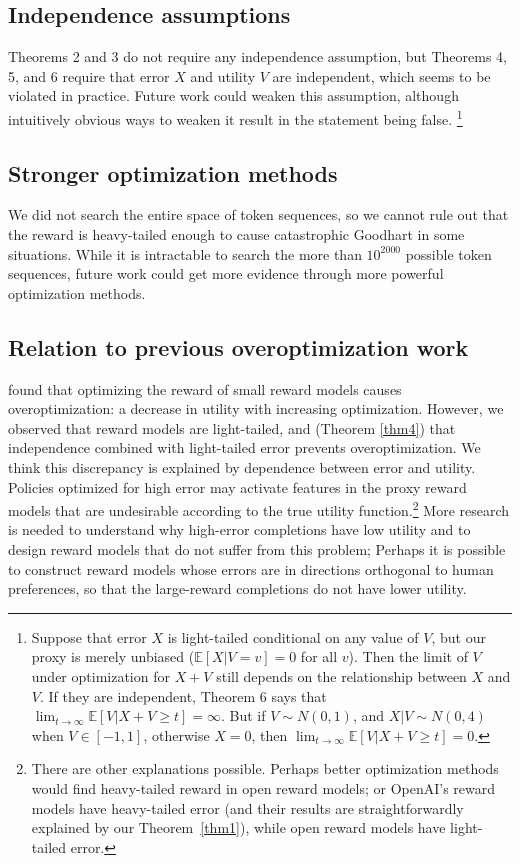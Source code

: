 \documentclass{article}
\theoremstyle{plain}
\theoremstyle{definition}
\theoremstyle{remark}
\begin{document}
\subsection{Independence assumptions}

Theorems 2 and 3 do not require any independence assumption, but Theorems 4, 5, and 6 require that error $X$ and utility $V$ are independent, which seems to be violated in practice. Future work could weaken this assumption, although intuitively obvious ways to weaken it result in the statement being false. \footnote{Suppose that error $X$ is light-tailed conditional on any value of $V$, but our proxy is merely unbiased ($\mathbb E[X|V=v]=0$ for all $v$). Then the limit of $V$ under optimization for $X+V$ still depends on the relationship between $X$ and $V$. If they are independent, Theorem 6 says that \(\lim_{t \to\infty} \mathbb E[V | X + V \ge t] = \infty\). But if \(V \sim N(0, 1)\), and \(X | V \sim N(0, 4)\) when \(V \in [-1, 1]\), otherwise \(X=0\), then \(\lim_{t \to\infty} \mathbb E[V | X + V \ge t] = 0\).} 

\subsection{Stronger optimization methods}

We did not search the entire space of token sequences, so we cannot rule out that the reward is heavy-tailed enough to cause catastrophic Goodhart in some situations. While it is intractable to search the more than $10^{2000}$ possible token sequences, future work could get more evidence through more powerful optimization methods.

\subsection{Relation to previous overoptimization work}

\citet{gao2023scaling} found that optimizing the reward of small reward models causes overoptimization: a decrease in utility with increasing optimization. However, we observed that reward models are light-tailed, and (Theorem \ref{thm4}) that independence combined with light-tailed error prevents overoptimization. We think this discrepancy is explained by dependence between error and utility. Policies optimized for high error may activate features in the proxy reward models that are undesirable according to the true utility function.\footnote{There are other explanations possible. Perhaps better optimization methods would find heavy-tailed reward in open reward models; or OpenAI's reward models have heavy-tailed error (and their results are straightforwardly explained by our Theorem~\ref{thm1}), while open reward models have light-tailed error.}
More research is needed to understand why high-error completions have low utility and to design reward models that do not suffer from this problem; Perhaps it is possible to construct reward models whose errors are in directions orthogonal to human preferences, so that the large-reward completions do not have lower utility.
\end{document}
